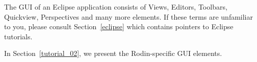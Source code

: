 The GUI of an Eclipse application consists of Views, Editors, Toolbars, Quickview, Perspectives and many more elements.  If these terms are unfamiliar to you, please consult Section~\ref{eclipse} which contains pointers to Eclipse tutorials.

In Section~\ref{tutorial_02}, we present the Rodin-specific GUI elements.

